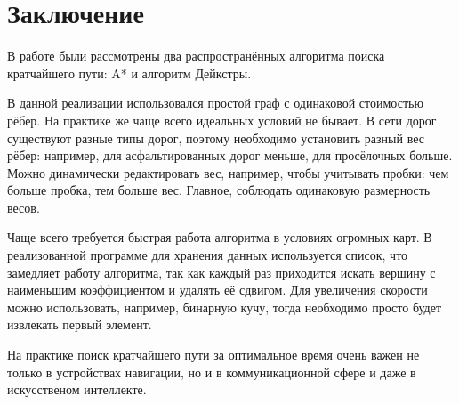 \section{Заключение}
В работе были рассмотрены два распространённых алгоритма поиска кратчайшего пути: A* и алгоритм Дейкстры.

В данной реализации использовался простой граф с одинаковой стоимостью рёбер. На практике же чаще всего идеальных условий не бывает. В сети дорог существуют разные типы дорог, поэтому необходимо установить разный вес рёбер: например, для асфальтированных дорог меньше, для просёлочных больше. Можно динамически редактировать вес, например, чтобы учитывать пробки: чем больше пробка, тем больше вес. Главное, соблюдать одинаковую размерность весов.

Чаще всего требуется быстрая работа алгоритма в условиях огромных карт. В реализованной программе для хранения данных используется список, что замедляет работу алгоритма, так как каждый раз приходится искать вершину с наименьшим коэффициентом и удалять её сдвигом. Для увеличения скорости можно использовать, например, бинарную кучу, тогда необходимо просто будет извлекать первый элемент.

На практике поиск кратчайшего пути за оптимальное время очень важен не только в устройствах навигации, но и в коммуникационной сфере и даже в искусственом интеллекте.